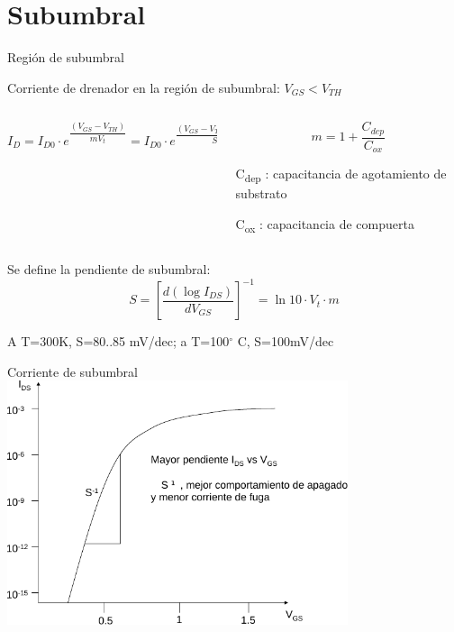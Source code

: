 \documentclass[t,aspectratio=169]{beamer}
\begin{document}
\section{Subumbral}
\begin{frame}{Región de subumbral}

Corriente de drenador en la región de subumbral: $V_{GS} < V_{TH}$

\begin{columns}

\begin{column}{0.7\textwidth}

\begin{tcolorbox}
\[ I_D = I_{D0} \cdot e^{\dfrac{(V_{GS} - V_{TH})}{mV_t}} = I_{D0} \cdot e^{\dfrac{(V_{GS} - V_{TH}) \ln 10}{S}} \]
\end{tcolorbox}

\end{column}

\begin{column}{0.3\textwidth}

\[ m = 1 + \dfrac{C_{dep}}{C_{ox}} \]

C\textsubscript{dep} : capacitancia de agotamiento de substrato

C\textsubscript{ox} : capacitancia de compuerta

\end{column}

\end{columns}

Se define la pendiente de subumbral:
\[ S = \left[\dfrac{d(\log I_{DS})}{dV_{GS}}\right]^{-1} = \ln 10 \cdot V_t \cdot m \]

\centering A T=300K, S=80..85 mV/dec; a T=100$^\circ$ C, S=100mV/dec


\end{frame}


\begin{frame}{Corriente de subumbral}
\centering
\includegraphics[width=10cm]{figuras/subth.pdf}
\end{frame}
\end{document}
